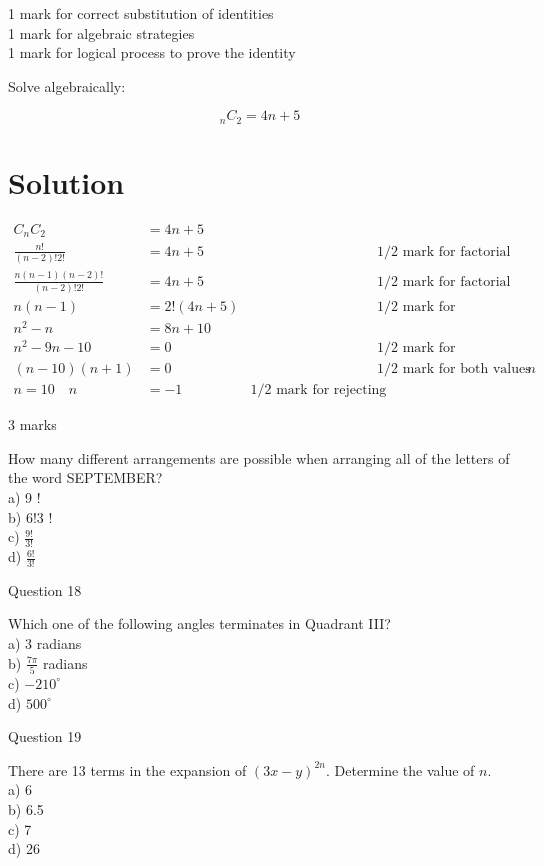 \documentclass[10pt]{article}
\begin{document}
1 mark for correct substitution of identities\\
1 mark for algebraic strategies\\
1 mark for logical process to prove the identity

Solve algebraically:

$$
{ }_{n} C_{2}=4 n+5
$$

\section*{Solution}
$$
\begin{array}{rlrl}
C_{n} C_{2} & =4 n+5 & & \\
\frac{n!}{(n-2)!2!} & =4 n+5 & & 1 / 2 \text { mark for factorial notation } \\
\frac{n(n-1)(n-2)!}{(n-2)!2!} & =4 n+5 & & 1 / 2 \text { mark for factorial expansion } \\
n(n-1) & =2!(4 n+5) & & 1 / 2 \text { mark for simplification of factorial } \\
n^{2}-n & =8 n+10 & & \\
n^{2}-9 n-10 & =0 & & 1 / 2 \text { mark for simplification } \\
(n-10)(n+1) & =0 & & 1 / 2 \text { mark for both values of } n \\
n=10 \quad n & =-1 & 1 / 2 \text { mark for rejecting extraneous root }
\end{array}
$$

3 marks

How many different arrangements are possible when arranging all of the letters of the word SEPTEMBER?\\
a) 9 !\\
b) $6!3$ !\\
c) $\frac{9!}{3!}$\\
d) $\frac{6!}{3!}$

Question 18

Which one of the following angles terminates in Quadrant III?\\
a) 3 radians\\
b) $\frac{7 \pi}{5}$ radians\\
c) $-210^{\circ}$\\
d) $500^{\circ}$

Question 19

There are 13 terms in the expansion of $(3 x-y)^{2 n}$. Determine the value of $n$.\\
a) 6\\
b) 6.5\\
c) 7\\
d) 26
\end{document}
